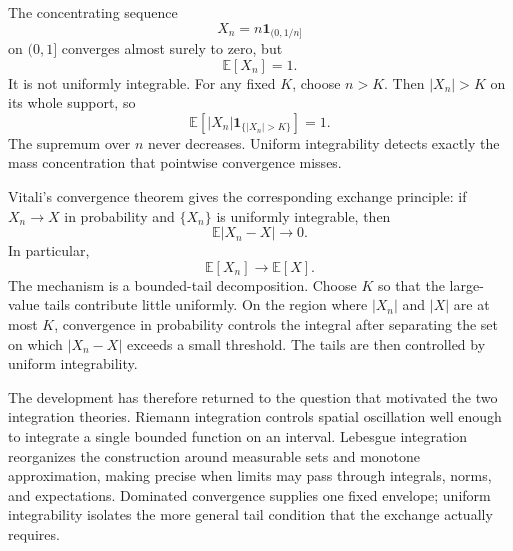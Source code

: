 The concentrating sequence
\[
  X_n=n\mathbf1_{(0,1/n]}
\]
on \((0,1]\) converges almost surely to zero, but
\[
  \mathbb E[X_n]=1.
\]
It is not uniformly integrable.  For any fixed \(K\), choose \(n>K\).  Then \(|X_n|>K\) on its whole support, so
\[
  \mathbb E\left[
    |X_n|\mathbf1_{\{|X_n|>K\}}
  \right]=1.
\]
The supremum over \(n\) never decreases.  Uniform integrability detects exactly the mass concentration that pointwise convergence misses.

Vitali's convergence theorem gives the corresponding exchange principle: if \(X_n\to X\) in probability and \(\{X_n\}\) is uniformly integrable, then
\[
  \mathbb E|X_n-X|\to0.
\]
In particular,
\[
  \mathbb E[X_n]\to\mathbb E[X].
\]
The mechanism is a bounded-tail decomposition.  Choose \(K\) so that the large-value tails contribute little uniformly.  On the region where \(|X_n|\) and \(|X|\) are at most \(K\), convergence in probability controls the integral after separating the set on which \(|X_n-X|\) exceeds a small threshold.  The tails are then controlled by uniform integrability.

The development has therefore returned to the question that motivated the two integration theories.  Riemann integration controls spatial oscillation well enough to integrate a single bounded function on an interval.  Lebesgue integration reorganizes the construction around measurable sets and monotone approximation, making precise when limits may pass through integrals, norms, and expectations.  Dominated convergence supplies one fixed envelope; uniform integrability isolates the more general tail condition that the exchange actually requires.

